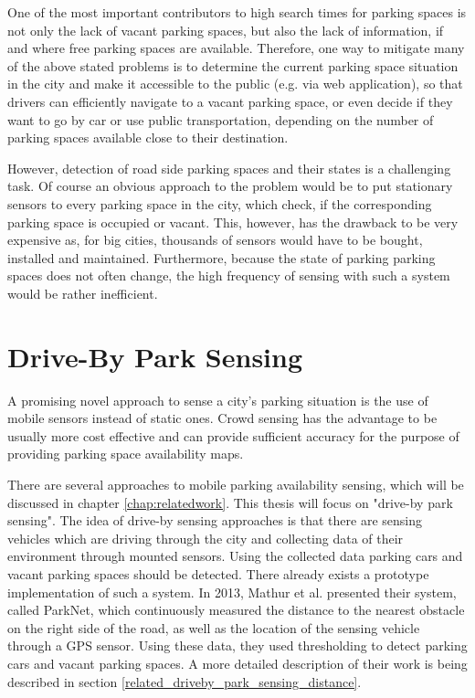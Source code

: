 One of the most important contributors to high search times for parking spaces is not only the lack of vacant parking spaces, but also the lack of information, if and where free parking spaces are available. Therefore, one way to mitigate many of the above stated problems is to determine the current parking space situation in the city and make it accessible to the public (e.g. via web application), so that drivers can efficiently navigate to a vacant parking space, or even decide if they want to go by car or use public transportation, depending on the number of parking spaces available close to their destination. 

However, detection of road side parking spaces and their states is a challenging task. Of course an obvious approach to the problem would be to put stationary sensors to every parking space in the city, which check, if the corresponding parking space is occupied or vacant. This, however, has the drawback to be very expensive as, for big cities, thousands of sensors would have to be bought, installed and maintained. Furthermore, because the state of parking parking spaces does not often change, the high frequency of sensing with such a system would be rather inefficient.





\section{Drive-By Park Sensing}

A promising novel approach to sense a city's parking situation is the use of mobile sensors instead of static ones. Crowd sensing has the advantage to be usually more cost effective and can provide sufficient accuracy for the purpose of providing parking space availability maps.

There are several approaches to mobile parking availability sensing, which will be discussed in chapter \ref{chap:relatedwork}. This thesis will focus on "drive-by park sensing". The idea of drive-by sensing approaches is that there are sensing vehicles which are driving through the city and collecting data of their environment through mounted sensors. Using the collected data parking cars and vacant parking spaces should be detected. There already exists a prototype implementation of such a system. In 2013, Mathur et al. \cite{Mathur:2010:PDS:1814433.1814448} presented their system, called ParkNet, which continuously measured the distance to the nearest obstacle on the right side of the road, as well as the location of the sensing vehicle through a GPS sensor. Using these data, they used thresholding to detect parking cars and vacant parking spaces. A more detailed description of their work is being described in section \ref{related_driveby_park_sensing_distance}.

